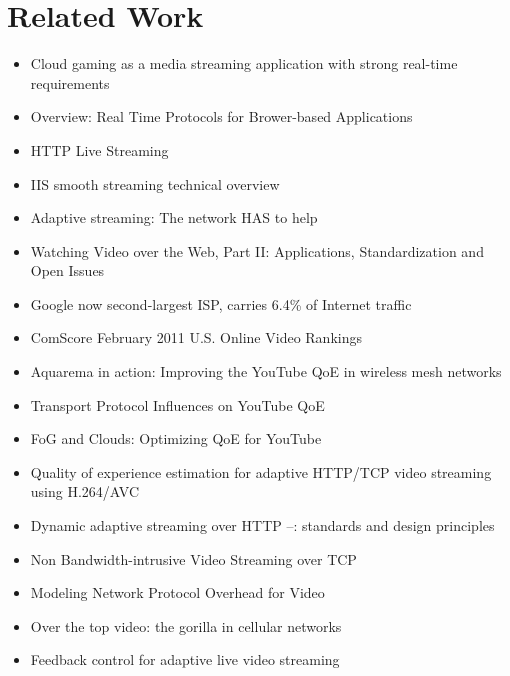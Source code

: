 \section{Related Work}

\begin{itemize}
	\item Cloud gaming as a media streaming application with strong real-time requirements \cite{4795441,wang2009modeling,jarschel2011cloudevaluation,ct2010wolken}

	\item Overview: Real Time Protocols for Brower-based Applications\cite{ietf2011rtcwebdraft}
	\item HTTP Live Streaming \cite{pantos2011livestreaming}
	\item IIS smooth streaming technical overview \cite{zambelli_iis_2009}
	\item Adaptive streaming: The network HAS to help \cite{BLTJ:BLTJ20505}
	\item Watching Video over the Web, Part II: Applications, Standardization and Open Issues \cite{watching-video2}
	\item Google now second-largest ISP, carries 6.4\% of Internet traffic \cite{nw2010carrier}
	\item ComScore February 2011 U.S. Online Video Rankings \cite{comscore2011ranking}
	\item Aquarema in action: Improving the YouTube QoE in wireless mesh networks \cite{5733220}
	\item Transport Protocol Influences on YouTube QoE \cite{report2011-258}
	\item FoG and Clouds: Optimizing QoE for YouTube \cite{hossfeld2011fog}
	\item Quality of experience estimation for adaptive HTTP/TCP video streaming using H.264/AVC \cite{6181070}
	\item Dynamic adaptive streaming over HTTP --: standards and design principles \cite{Stockhammer:2011:DAS:1943552.1943572}
	\item Non Bandwidth-intrusive Video Streaming over TCP \cite{5945211}
	\item Modeling Network Protocol Overhead for Video \cite{5703713}
	\item Over the top video: the gorilla in cellular networks \cite{Erman:2011:OTV:2068816.2068829}
	\item Feedback control for adaptive live video streaming \cite{DeCicco:2011:FCA:1943552.1943573}

\end{itemize}
